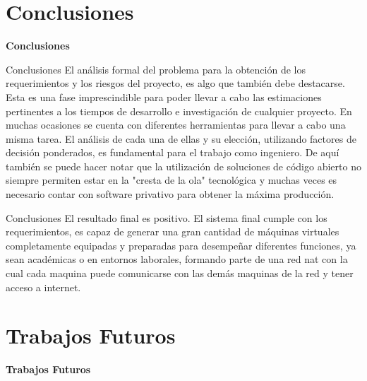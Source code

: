 \section{Conclusiones}
\begin{frame}
    \Huge
    \centering
    \textbf{ Conclusiones }

\end{frame}

\begin{frame}{Conclusiones}
    \vspace{-1.5cm}
    El análisis formal del problema para la obtención de los requerimientos y los riesgos del proyecto, es algo que también debe destacarse. Esta es una fase imprescindible para poder llevar a cabo las estimaciones pertinentes a los tiempos de desarrollo e investigación de cualquier proyecto. En muchas ocasiones se cuenta con diferentes herramientas para llevar a cabo una misma tarea. El análisis de cada una de ellas y su elección, utilizando factores de decisión ponderados, es fundamental para el trabajo como ingeniero. De aquí también se puede hacer notar que la utilización de soluciones de código abierto no siempre permiten estar en la "cresta de la ola" tecnológica y muchas veces es necesario contar con software privativo para obtener la máxima producción.

\end{frame}


\begin{frame}{Conclusiones}
    \vspace{-1.5cm}
    El resultado final es positivo. El sistema final cumple con los requerimientos, es capaz de generar una gran cantidad de máquinas virtuales completamente equipadas y preparadas para desempeñar diferentes funciones, ya sean académicas o en entornos laborales, formando parte de una red nat con la cual cada maquina puede comunicarse con las demás maquinas de la red y tener acceso a internet.

\end{frame}


\section{Trabajos Futuros}
\begin{frame}
    \Huge
    \centering
    \textbf{Trabajos Futuros}

\end{frame}


